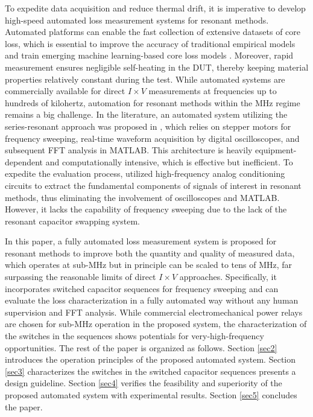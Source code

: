 \documentclass[conference]{IEEEtran}
\begin{document}
To expedite data acquisition and reduce thermal drift, it is imperative to develop high-speed automated loss measurement systems for resonant methods. Automated platforms can enable the fast collection of extensive datasets of core loss, which is essential to improve the accuracy of traditional empirical models and train emerging machine learning-based core loss models \cite{dserrano}. Moreover, rapid measurement ensures negligible self-heating in the DUT, thereby keeping material properties relatively constant during the test. While automated systems are commercially available for direct $I \times V$ measurements at frequencies up to hundreds of kilohertz, automation for resonant methods within the MHz regime remains a big challenge. In the literature, an automated system utilizing the series-resonant approach was proposed in \cite{janderson}, which relies on stepper motors for frequency sweeping, real-time waveform acquisition by digital oscilloscopes, and subsequent FFT analysis in MATLAB. This architecture is heavily equipment-dependent and computationally intensive, which is effective but inefficient. To expedite the evaluation process, \cite{hwang} utilized high-frequency analog conditioning circuits \cite{hwang2, hwang3} to extract the fundamental components of signals of interest in resonant methods, thus eliminating the involvement of oscilloscopes and MATLAB. However, it lacks the capability of frequency sweeping due to the lack of the resonant capacitor swapping system.  

In this paper, a fully automated loss measurement system is proposed for resonant methods to improve both the quantity and quality of measured data, which operates at sub-MHz but in principle can be scaled to tens of MHz, far surpassing the reasonable limits of direct $I \times V$ approaches. Specifically, it incorporates switched capacitor sequences for frequency sweeping and can evaluate the loss characterization in a fully automated way without any human supervision and FFT analysis. While commercial electromechanical power relays are chosen for sub-MHz operation in the proposed system, the characterization of the switches in the sequences shows potentials for very-high-frequency opportunities. The rest of the paper is organized as follows. Section \ref{sec2} introduces the operation principles of the proposed automated system. Section \ref{sec3} characterizes the switches in the switched capacitor sequences presents a design guideline. Section \ref{sec4} verifies the feasibility and superiority of the proposed automated system with experimental results. Section \ref{sec5} concludes the paper.
\end{document}
